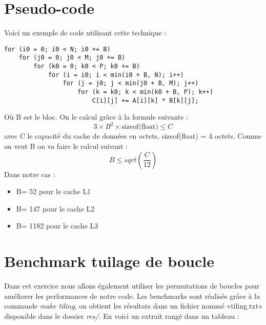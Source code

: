 \documentclass{rapport}
\begin{document}
\section{Pseudo-code}
Voici un exemple de code utilisant cette technique : \newline
\begin{lstlisting}
for (i0 = 0; i0 < N; i0 += B)
    for (j0 = 0; j0 < M; j0 += B)
        for (k0 = 0; k0 < P; k0 += B)
            for (i = i0; i < min(i0 + B, N); i++)
                for (j = j0; j < min(j0 + B, M); j++)
                    for (k = k0; k < min(k0 + B, P); k++)
                        C[i][j] += A[i][k] * B[k][j];
\end{lstlisting}
Où B est le bloc. On le calcul grâce à la formule suivante : 
\[
3 \times B^2 \times \text{sizeof(float)} \leq C
\]
avec C le capacité du cache de données en octets, sizeof(float) = 4 octets. Comme on veut B on va faire le calcul suivant :
\[
B \leq sqrt(\frac{C}{12})
\]
Dans notre cas :
\begin{itemize}
    \item B= 52 pour le cache L1
    \item B= 147 pour le cache L2
    \item B= 1182 pour le cache L3
\end{itemize}

\section{Benchmark tuilage de boucle} 
Dans cet exercice nous allons également utiliser les permutations de boucles pour améliorer les performances de notre code. Les benchmarks sont réalisés grâce à la commande \textit{make tiling}, on obtient les résultats dans un fichier nommé «tiling.txt» disponible dans le dossier \textit{res/}. En voici un extrait rangé dans un tableau :
\end{document}
